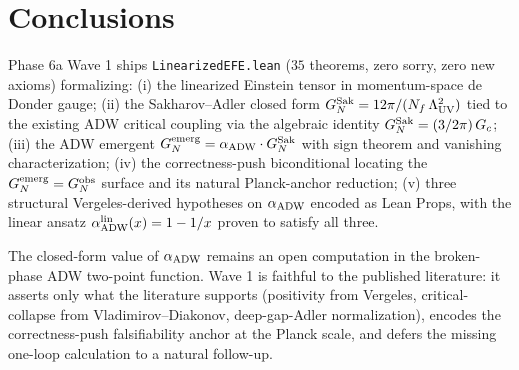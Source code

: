 \documentclass[aps,prd,twocolumn,showpacs,superscriptaddress,nofootinbib]{revtex4-2}
\newcommand{\GNobs}{G_{N}^{\rm obs}}
\newcommand{\GNemerg}{G_{N}^{\rm emerg}}
\newcommand{\GNsak}{G_{N}^{\rm Sak}}
\newcommand{\Lambdauv}{\Lambda_{\rm UV}}
\newcommand{\Nf}{N_{f}}
\newcommand{\aADW}{\alpha_{\rm ADW}}
\newcommand{\Gc}{G_{c}}
\begin{document}
\section{Conclusions}
\label{sec:conclusions}

Phase 6a Wave 1 ships \texttt{LinearizedEFE.lean}
($35$ theorems, zero sorry, zero new axioms)
formalizing: (i) the linearized Einstein tensor in momentum-space
de Donder gauge; (ii) the Sakharov--Adler closed form
$\GNsak = 12\pi/(\Nf\,\Lambdauv^{2})$ tied to the existing ADW
critical coupling via the algebraic identity
$\GNsak = (3/2\pi)\,\Gc$; (iii) the ADW emergent
$\GNemerg = \aADW \cdot \GNsak$ with sign theorem and vanishing
characterization; (iv) the correctness-push biconditional locating
the $\GNemerg = \GNobs$ surface and its natural Planck-anchor
reduction; (v) three structural Vergeles-derived hypotheses
on $\aADW$ encoded as Lean Props, with the linear ansatz
$\aADW^{\rm lin}(x) = 1 - 1/x$ proven to satisfy all three.

The closed-form value of $\aADW$ remains an open computation in
the broken-phase ADW two-point function. Wave 1 is faithful to
the published literature: it asserts only what the literature
supports (positivity from Vergeles, critical-collapse from
Vladimirov--Diakonov, deep-gap-Adler normalization), encodes the
correctness-push falsifiability anchor at the Planck scale, and
defers the missing one-loop calculation to a natural follow-up.
\end{document}
